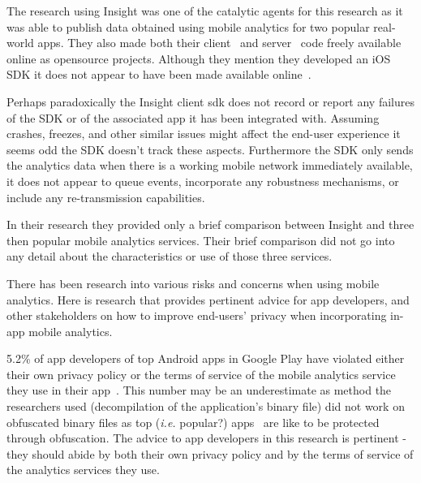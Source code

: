 The research using Insight was one of the catalytic agents for this research as it was able to publish data obtained using mobile analytics for two popular real-world apps. 
They also made both their client~ and server~ code freely available online as opensource projects. 
Although they mention they developed an iOS SDK it does not appear to have been made available online~.

Perhaps paradoxically the Insight client \Gls{sdk} does not record or report any failures of the SDK or of the associated app it has been integrated with. Assuming crashes, freezes, and other similar issues might affect the end-user experience it seems odd the SDK doesn't track these aspects. Furthermore the SDK only sends the analytics data when there is a working mobile network immediately available, it does not appear to queue events, incorporate any robustness mechanisms, or include any re-transmission capabilities. 

In their research they provided only a brief comparison between Insight and three then popular mobile analytics services. Their brief comparison did not go into any detail about the characteristics or use of those three services.

There has been research into various risks and concerns when using mobile analytics. Here is research that provides pertinent advice for app developers, and other stakeholders on how to improve end-users' privacy when incorporating in-app mobile analytics.

5.2\% of app developers of top Android apps in Google Play have violated either their own privacy policy or the terms of service of the mobile analytics service they use in their app~. This number may be an underestimate as method the researchers used (decompilation of the application's binary file) did not work on obfuscated binary files as top (\emph{i.e.} popular?) apps~ are like to be protected through obfuscation. The advice to app developers in this research is pertinent - they should abide by both their own privacy policy and by the terms of service of the analytics services they use.

